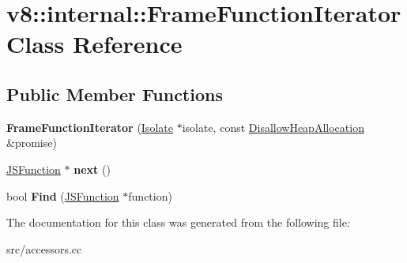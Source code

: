 \hypertarget{classv8_1_1internal_1_1_frame_function_iterator}{}\section{v8\+:\+:internal\+:\+:Frame\+Function\+Iterator Class Reference}
\label{classv8_1_1internal_1_1_frame_function_iterator}
\subsection*{Public Member Functions}
\begin{DoxyCompactItemize}
\item 
\hypertarget{classv8_1_1internal_1_1_frame_function_iterator_a6779f983e3e413a198dc6e6e24820903}{}{\bfseries Frame\+Function\+Iterator} (\hyperlink{classv8_1_1internal_1_1_isolate}{Isolate} $\ast$isolate, const \hyperlink{classv8_1_1internal_1_1_per_thread_assert_scope_debug_only}{Disallow\+Heap\+Allocation} \&promise)\label{classv8_1_1internal_1_1_frame_function_iterator_a6779f983e3e413a198dc6e6e24820903}

\item 
\hypertarget{classv8_1_1internal_1_1_frame_function_iterator_ad9c0f74e2f1f16ddaf19736fc9eb4148}{}\hyperlink{classv8_1_1internal_1_1_j_s_function}{J\+S\+Function} $\ast$ {\bfseries next} ()\label{classv8_1_1internal_1_1_frame_function_iterator_ad9c0f74e2f1f16ddaf19736fc9eb4148}

\item 
\hypertarget{classv8_1_1internal_1_1_frame_function_iterator_a0f6b3608e8dd05045ad7376ba69b26b6}{}bool {\bfseries Find} (\hyperlink{classv8_1_1internal_1_1_j_s_function}{J\+S\+Function} $\ast$function)\label{classv8_1_1internal_1_1_frame_function_iterator_a0f6b3608e8dd05045ad7376ba69b26b6}

\end{DoxyCompactItemize}


The documentation for this class was generated from the following file\+:\begin{DoxyCompactItemize}
\item 
src/accessors.\+cc\end{DoxyCompactItemize}
